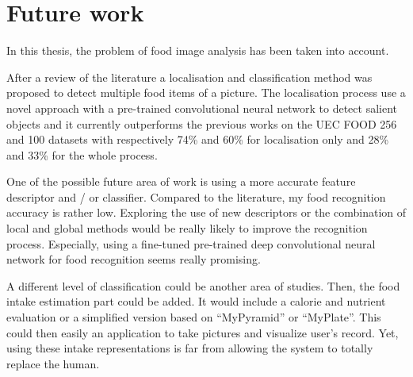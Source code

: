 \chapter{Future work} \label{sec:conclusion}

In this thesis, the problem of food image analysis has been taken into account.

After a review of the literature a localisation and classification method was proposed to detect multiple food items of a picture. The localisation process use a novel approach with a pre-trained convolutional neural network to detect salient objects and it currently outperforms the previous works on the UEC FOOD 256 and 100 datasets with respectively 74\% and 60\% for localisation only and 28\% and 33\% for the whole process.

One of the possible future area of work is using a more accurate feature descriptor and / or classifier. Compared to the literature, my food recognition accuracy is rather low. Exploring the use of new descriptors or the combination of local and global methods would be really likely to improve the recognition process. Especially, using a fine-tuned pre-trained deep convolutional neural network for food recognition seems really promising.

A different level of classification could be another area of studies. Then, the food intake estimation part could be added. It would include a calorie and nutrient evaluation or a simplified version based on \enquote{MyPyramid} or \enquote{MyPlate}. This could then easily  an application to take pictures and visualize user's record. Yet, using these intake representations is far from allowing the system to totally replace the human.